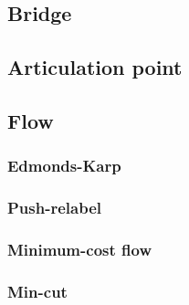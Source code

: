 \subsection{Bridge}


\subsection{Articulation point}


\subsection{Flow}

\subsubsection{Edmonds-Karp}


\subsubsection{Push-relabel}


\subsubsection{Minimum-cost flow}


\subsubsection{Min-cut}

